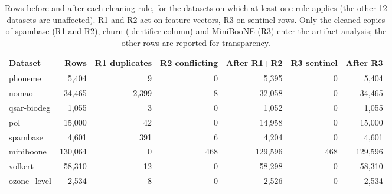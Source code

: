 \documentclass[pdflatex,sn-mathphys]{sn-jnl}
\theoremstyle{thmstyleone}
\begin{document}
\begin{table}[htbp]
\centering\small
\caption{Rows before and after each cleaning rule, for the datasets on which at least one rule applies (the other 12 datasets are unaffected). R1 and R2 act on feature vectors, R3 on sentinel rows. Only the cleaned copies of spambase (R1 and R2), churn (identifier column) and MiniBooNE (R3) enter the artifact analysis; the other rows are reported for transparency.}\label{tab:cleaning_counts}
\begin{tabular}{@{}lrrrrrr@{}}
\toprule
Dataset & Rows & R1 duplicates & R2 conflicting & After R1+R2 & R3 sentinel & After R3 \\
\midrule
phoneme & 5{,}404 & 9 & 0 & 5{,}395 & 0 & 5{,}404 \\
nomao & 34{,}465 & 2{,}399 & 8 & 32{,}058 & 0 & 34{,}465 \\
qsar-biodeg & 1{,}055 & 3 & 0 & 1{,}052 & 0 & 1{,}055 \\
pol & 15{,}000 & 42 & 0 & 14{,}958 & 0 & 15{,}000 \\
spambase & 4{,}601 & 391 & 6 & 4{,}204 & 0 & 4{,}601 \\
miniboone & 130{,}064 & 0 & 468 & 129{,}596 & 468 & 129{,}596 \\
volkert & 58{,}310 & 12 & 0 & 58{,}298 & 0 & 58{,}310 \\
ozone\_level & 2{,}534 & 8 & 0 & 2{,}526 & 0 & 2{,}534 \\
\bottomrule
\end{tabular}
\end{table}
\end{document}
